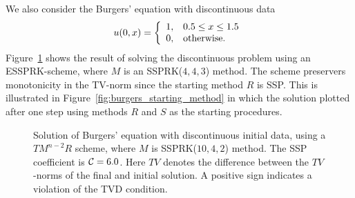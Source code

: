 We also consider the Burgers' equation with discontinuous data
\begin{equation}\label{eq:burgers_discont_IC}
    u(0,x)  = \left\{
                \begin{array}{ll}
                  1, & \hbox{$0.5 \leq x \leq 1.5$} \\
                  0, & \hbox{otherwise.}
                \end{array}
              \right.
\end{equation}
Figure~\ref{fig:burgers_discont} shows the result of solving the 
discontinuous problem using an ESSPRK-scheme, where $M$ is an 
SSPRK($4,4,3$) method. 
The scheme preservers monotonicity in the TV-norm since the starting 
method $R$ is SSP. 
This is illustrated in Figure~\ref{fig:burgers_starting_method} in which 
the solution plotted after one step using methods $R$ and $S$ as the 
starting procedures.

\begin{figure}[t!]
    \centering
    \caption{Solution of Burgers' equation with discontinuous initial data, using a 
    $TM^{n-2}R$ scheme, where $M$ is SSPRK($10,4,2$) method. 
    The SSP coefficient is $ \mathcal{C} = 6.0$.
    Here $TV$ denotes the difference between the $TV$-norms of the final and 
    initial solution.
    A positive sign indicates a violation of the TVD condition.}
    \label{fig:burgers_discont}
\end{figure}

